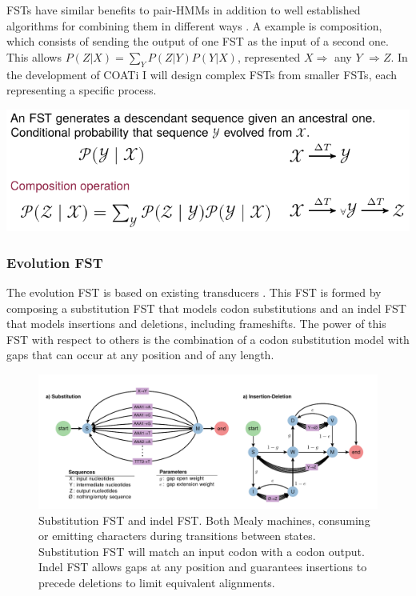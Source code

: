 FSTs have similar benefits to pair-HMMs in addition to well established
algorithms for combining them in different ways .
A  example is composition, which
consists of sending the output of one FST as the input of a second one.
This allows $P(Z|X) = \sum_Y P(Z|Y) P(Y|X)$, represented $X \Rightarrow$ any
$Y$ $\Rightarrow Z$.
In the development of COATi I will design complex FSTs from smaller FSTs, each
representing a specific process.

\begin{center}
\includegraphics[scale=1]{figures/fig-fst.pdf}
\end{center}

\subsubsection{Evolution FST}

The evolution FST is based on existing transducers .
This FST is formed by composing a substitution FST that models codon
substitutions and an indel FST that models insertions and deletions, including
frameshifts.
The power of this FST with respect to others is the combination of a codon
substitution model with gaps that can occur at any position and of any length.

\begin{figure}
\centering
    \hspace*{-2cm}\includegraphics[width=\textwidth]{figures/fig-evolution-fst.pdf}
    \caption{Substitution FST and indel FST. Both Mealy machines, consuming or
    emitting characters during transitions between states. Substitution FST will
    match an input codon with a codon output.
    Indel FST allows gaps at any position and guarantees insertions to precede
    deletions to limit equivalent alignments.}
\centering
\end{figure}

